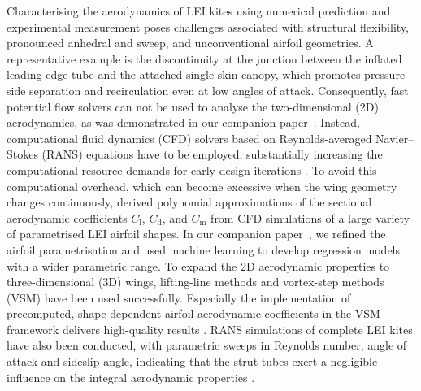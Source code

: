 \documentclass[wes, manuscript]{copernicus}
\begin{document}
Characterising the aerodynamics of LEI kites using numerical prediction and experimental measurement poses challenges associated with structural flexibility, pronounced anhedral and sweep, and unconventional airfoil geometries. A representative example is the discontinuity at the junction between the inflated leading-edge tube and the attached single-skin canopy, which promotes pressure-side separation and recirculation even at low angles of attack. Consequently, fast potential flow solvers can not be used to analyse the two-dimensional (2D) aerodynamics, as was demonstrated in our companion paper~\citep{Poland2026b}. Instead, computational fluid dynamics (CFD) solvers based on Reynolds-averaged Navier–Stokes (RANS) equations have to be employed, substantially increasing the computational resource demands for early design iterations \citep{Folkersma2019}. To avoid this computational overhead, which can become excessive when the wing geometry changes continuously, \cite{Breukels2011} derived polynomial approximations of the sectional aerodynamic coefficients $C_\textrm{l}$, $C_\textrm{d}$, and $C_\textrm{m}$ from CFD simulations of a large variety of parametrised LEI airfoil shapes. In our companion paper~\citep{Poland2026b}, we refined the airfoil parametrisation and used machine learning to develop regression models with a wider parametric range.
To expand the 2D aerodynamic properties to three-dimensional (3D) wings, lifting-line methods \citep{Leloup2013} and vortex-step methods (VSM) \citep{Damiani2019,Cayon2023} have been used successfully. 
Especially the implementation of precomputed, shape-dependent airfoil aerodynamic coefficients in the VSM framework delivers high-quality results \citep{Poland2026b}.
RANS simulations of complete LEI kites have also been conducted, with parametric sweeps in Reynolds number, angle of attack and sideslip angle, indicating that the strut tubes exert a negligible influence on the integral aerodynamic properties \citep{Vire2020,Vire2022}.
\end{document}
